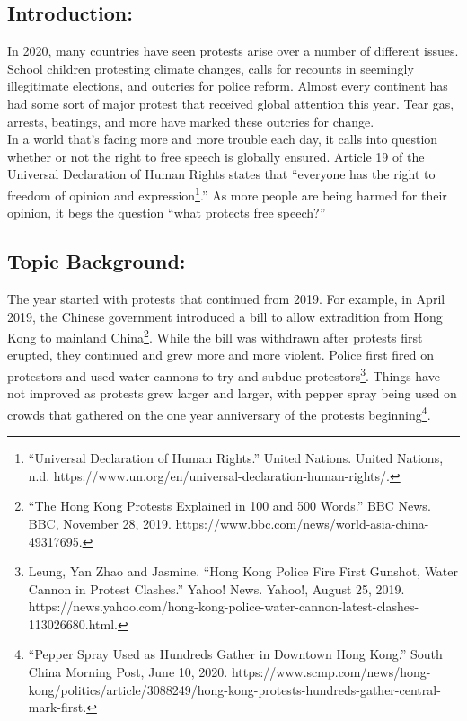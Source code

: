 \documentclass[10pt, letterpaper]{article}
\begin{document}
\subsection{Introduction:}

In 2020, many countries have seen protests arise over a number of
different issues. School children protesting climate changes, calls for
recounts in seemingly illegitimate elections, and outcries for police
reform. Almost every continent has had some sort of major protest that
received global attention this year. Tear gas, arrests, beatings, and
more have marked these outcries for change. \\

In a world that's facing more and more trouble each day, it calls into
question whether or not the right to free speech is globally ensured.
Article 19 of the Universal Declaration of Human Rights states that
``everyone has the right to freedom of opinion and
expression\footnote{``Universal Declaration of Human Rights.'' United
  Nations. United Nations, n.d.
  https://www.un.org/en/universal-declaration-human-rights/.}.'' As more
people are being harmed for their opinion, it begs the question ``what
protects free speech?'' \\

\subsection{Topic Background:}

The year started with protests that continued from 2019. For example, in
April 2019, the Chinese government introduced a bill to allow
extradition from Hong Kong to mainland China\footnote{``The Hong Kong
  Protests Explained in 100 and 500 Words.'' BBC News. BBC, November 28,
  2019. https://www.bbc.com/news/world-asia-china-49317695.}. While the
bill was withdrawn after protests first erupted, they continued and grew
more and more violent. Police first fired on protestors and used water
cannons to try and subdue protestors\footnote{Leung, Yan Zhao and
  Jasmine. ``Hong Kong Police Fire First Gunshot, Water Cannon in
  Protest Clashes.'' Yahoo! News. Yahoo!, August 25, 2019.
  https://news.yahoo.com/hong-kong-police-water-cannon-latest-clashes-113026680.html.}.
Things have not improved as protests grew larger and larger, with pepper
spray being used on crowds that gathered on the one year anniversary of
the protests beginning\footnote{``Pepper Spray Used as Hundreds Gather
  in Downtown Hong Kong.'' South China Morning Post, June 10, 2020.
  https://www.scmp.com/news/hong-kong/politics/article/3088249/hong-kong-protests-hundreds-gather-central-mark-first.}. \\
\end{document}
